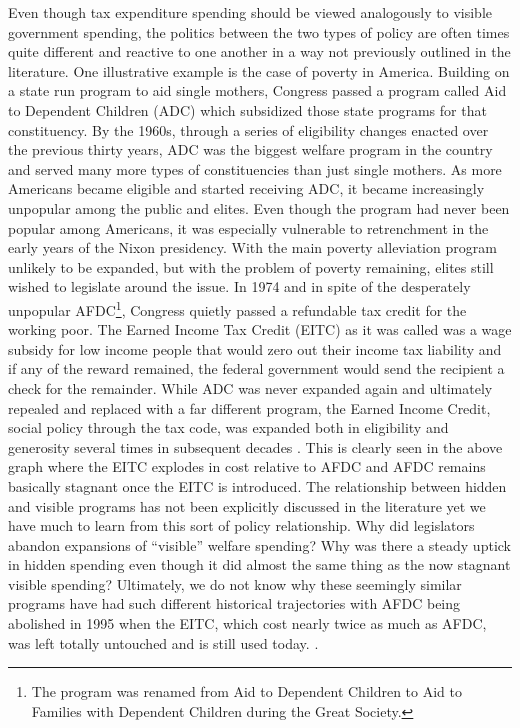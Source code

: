 \documentclass[12pt]{article}
\begin{document}
Even though tax expenditure spending should be viewed analogously to visible government spending, the politics between the two types of policy are often times quite different and reactive to one another in a way not previously outlined in the literature. One illustrative example is the case of poverty in America. Building on a state run program to aid single mothers, Congress passed a program called Aid to Dependent Children (ADC) which subsidized those state programs for that constituency. By the 1960s, through a series of eligibility changes enacted over the previous thirty years, ADC was the biggest welfare program in the country and served many more types of constituencies than just single mothers. As more Americans became eligible and started receiving ADC, it became increasingly unpopular among the public and elites. Even though the program had never been popular among Americans, it was especially vulnerable to retrenchment in the early years of the Nixon presidency. With the main poverty alleviation program unlikely to be expanded, but with the problem of poverty remaining, elites still wished to legislate around the issue. In 1974 and in spite of the desperately unpopular AFDC\footnote{The program was renamed from Aid to Dependent Children to Aid to Families with Dependent Children during the Great Society.}, Congress quietly passed a refundable tax credit for the working poor. The Earned Income Tax Credit (EITC) as it was called was a wage subsidy for low income people that would zero out their income tax liability and if any of the reward remained, the federal government would send the recipient a check for the remainder. While ADC was never expanded again and ultimately repealed and replaced with a far different program, the Earned Income Credit, social policy through the tax code, was expanded both in eligibility and generosity several times in subsequent decades \citep{stewart1991}. This is clearly seen in the above graph where the EITC explodes in cost relative to AFDC and AFDC remains basically stagnant once the EITC is introduced. The relationship between hidden and visible programs has not been  explicitly discussed in the literature yet we have much to learn from this sort of policy relationship. Why did legislators abandon expansions of ``visible'' welfare spending? Why was there a steady uptick in hidden spending even though it did almost the same thing as the now stagnant visible spending? Ultimately, we do not know why these seemingly similar programs have had such different historical trajectories with AFDC being abolished in 1995 when the EITC, which cost nearly twice as much as AFDC, was left totally untouched and is still used today. \citep{myles1997}.
\end{document}
